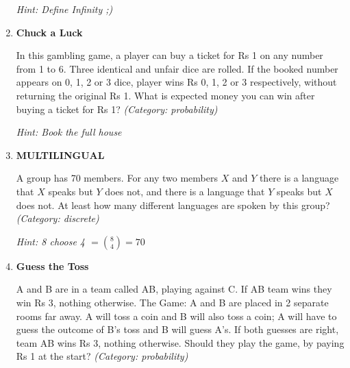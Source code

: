 \begin{enumerate}
\small\emph{Hint: Define Infinity ;)}





\item \textbf{Chuck a Luck}

In this gambling game, a player can buy a ticket for Rs 1 on any number from 1 to 6. Three identical and unfair dice are rolled. If the booked number appears on 0, 1, 2 or 3 dice, player wins Rs 0, 1, 2 or 3 respectively, without returning the original Rs 1. What is expected money you can win after buying a ticket for Rs 1?
\small\emph{(Category: probability)}

\small\emph{Hint: Book the full house}





\item \textbf{MULTILINGUAL}

A group has 70 members. For any two members $X$ and $Y$ there is a language that $X$ speaks but $Y$ does not, and there is a language that $Y$ speaks but $X$ does not. At least how many different languages are spoken by this group?
\small\emph{(Category: discrete)}

\small\emph{Hint: 8 choose 4 $= \binom{8}{4}  = 70$}





\item \textbf{Guess the Toss}

A and B are in a team called AB, playing against C. If AB team wins they win Rs 3, nothing otherwise.
The Game: A and B are placed in 2 separate rooms far away. A will toss a coin and B will also toss a coin; A will have to guess the outcome of B's toss and B will guess A's. If both guesses are right, team AB wins Rs 3, nothing otherwise.
Should they play the game, by paying Rs 1 at the start?
\small\emph{(Category: probability)}


\end{enumerate}
